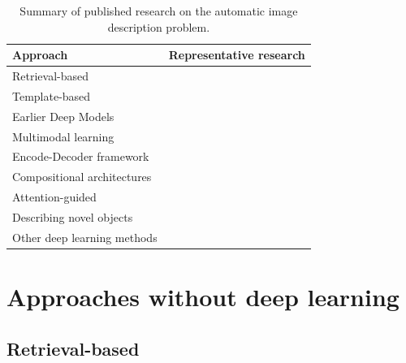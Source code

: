 \begin{table}[ht]
\centering
\caption{Summary of published research on the automatic image description problem.}
\label{tab:overview}
\begin{tabular}[t]{p{} p{}}
    \toprule
    Approach & Representative research\\
    \midrule
    Retrieval-based & \citet{Farhadi2010, Ordonez2011, Gupta2012, Kuznetsova2012, Hodosh2013a, Kuznetsova2014, Mason2015, Hodosh2013b}\\
    Template-based &  \citet{Yang2011, Kulkarni2011, Li2011, Mitchell2012, Ushiku2015}\\
    Earlier Deep Models &  \citet{Socher2014, Karpathy2014, Ma2015, Yan2015, Lebret2015a, Yagcioglu2015}\\
    Multimodal learning & \citet{Kiros2014_VS, Mao2015_mRNN, Karpathy2015, Chen2015}\\
    Encode-Decoder framework & \citet{Kiros2014_LBL, Vinyals2015, Donahue2015, Jia2015, Wu2016, Pu2016_DGDN, Gan2017_Style, Hao2018}\\ 
    Compositional architectures & \citet{Fang2015, Tran2016, Ma2016, Oruganti2016, Wang2016_Parallel, Fu2017, Gan2017_SCN}\\
    Attention-guided & \citet{Xu2015, You2016, Yang2016_RevNet, Zhou2017, Khademi2018, Anderson2018_BUTD, Jiang2018}\\
    Describing novel objects & \citet{Mao2015_Child, Hendricks2016}\\ 
    Other deep learning methods & \citet{Pu2016_VAE, Dai2017_CGAN, Shetty2017, Ren2017, Rennie2017, Zhang2017, Anderson2018_SemiSup, Feng2018, Gu2018, Li2018_CAL, Li2018_VS-LSTM, Lindh2018}\\
    \bottomrule
\end{tabular}
\end{table}


\section{Approaches without deep learning}

\subsection{Retrieval-based} \label{sec:retrieval-based_methods}

